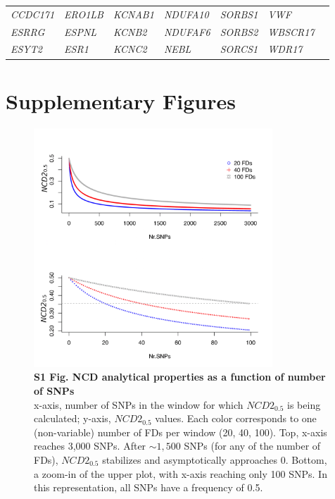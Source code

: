 \begin{refsection}
\begin{otherlanguage}{english}
\begin{scriptsize}
\begin{longtable}{lllllll}
\textit{CCDC171} & \textit{ERO1LB} & \textit{KCNAB1} & \textit{NDUFA10} & \textit{SORBS1} & \textit{VWF} & \textit{} \\
\textit{ESRRG} & \textit{ESPNL} & \textit{KCNB2} & \textit{NDUFAF6} & \textit{SORBS2} & \textit{WBSCR17} & \textit{} \\
\textit{ESYT2} & \textit{ESR1} & \textit{KCNC2} & \textit{NEBL} & \textit{SORCS1} & \textit{WDR17} & \textit{}
	

\end{longtable}
\end{scriptsize}


%
\newpage
\section{Supplementary Figures}

\begin{figure}[tbph]
\centering
\includegraphics[width=0.8\textwidth, keepaspectratio]{chap2_folder/supp_figures/S1_Fig.png}
\caption*{\textbf{S1 Fig. NCD analytical properties as a function of number of SNPs}\\
x-axis, number of SNPs in the window for which $NCD2_{0.5}$ is being calculated; y-axis, $NCD2_{0.5}$ values. Each color corresponds to one (non-variable) number of FDs per window (20, 40, 100). Top, x-axis reaches 3,000 SNPs. After $\sim 1,500$ SNPs (for any of the number of FDs), $NCD2_{0.5}$ stabilizes and asymptotically approaches 0. Bottom, a zoom-in of the upper plot, with x-axis reaching only 100 SNPs. In this representation, all SNPs have a frequency of 0.5.}
\end{figure}
%
%
%


\end{otherlanguage}
\end{refsection}
